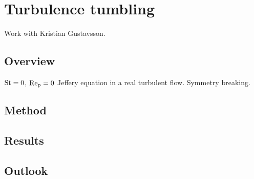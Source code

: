 \documentclass[thesis.tex]{subfiles}
\begin{document}
\chapter{Turbulence tumbling}

Work with Kristian Gustavsson.

\section{Overview}

$\mbox{St}=0$, $\mbox{Re}_{\mathrm p}=0$ Jeffery equation in a real turbulent flow. Symmetry breaking.

\section{Method}

\section{Results}

\section{Outlook}
\end{document}
